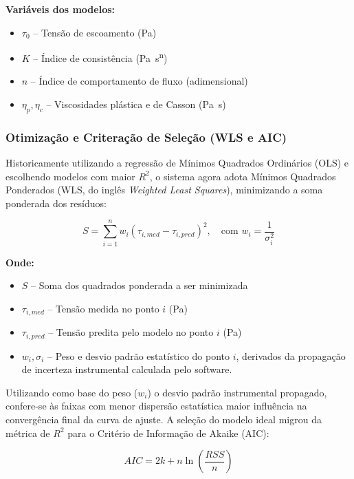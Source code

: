 \documentclass[a4paper,12pt]{article}
\begin{document}
\textbf{Variáveis dos modelos:}
\begin{itemize}[leftmargin=1.5em]
  \item $\tau_0$ -- Tensão de escoamento (\si{Pa})
  \item $K$ -- Índice de consistência (\si{Pa.s^n})
  \item $n$ -- Índice de comportamento de fluxo (adimensional)
  \item $\eta_p, \eta_c$ -- Viscosidades plástica e de Casson (\si{Pa.s})
\end{itemize}

\subsubsection*{Otimização e Criteração de Seleção (WLS e AIC)}
Historicamente utilizando a regressão de Mínimos Quadrados Ordinários (OLS) e escolhendo modelos com maior $R^2$, o sistema agora adota Mínimos Quadrados Ponderados (WLS, do inglês \textit{Weighted Least Squares}), minimizando a soma ponderada dos resíduos:

\begin{equation}
    S = \sum_{i=1}^n w_i (\tau_{i, med} - \tau_{i, pred})^2, \quad \text{com } w_i = \frac{1}{\sigma_i^2}
\end{equation}

\textbf{Onde:}
\begin{itemize}[leftmargin=1.5em]
  \item $S$ -- Soma dos quadrados ponderada a ser minimizada
  \item $\tau_{i, med}$ -- Tensão medida no ponto $i$ (\si{Pa})
  \item $\tau_{i, pred}$ -- Tensão predita pelo modelo no ponto $i$ (\si{Pa})
  \item $w_i, \sigma_i$ -- Peso e desvio padrão estatístico do ponto $i$, derivados da propagação de incerteza instrumental calculada pelo software.
\end{itemize}

Utilizando como base do peso ($w_i$) o desvio padrão instrumental propagado, confere-se às faixas com menor dispersão estatística maior influência na convergência final da curva de ajuste. A seleção do modelo ideal migrou da métrica de $R^2$ para o Critério de Informação de Akaike (AIC):

\begin{equation}
    AIC = 2k + n \ln\left(\frac{RSS}{n}\right)
\end{equation}
\end{document}
